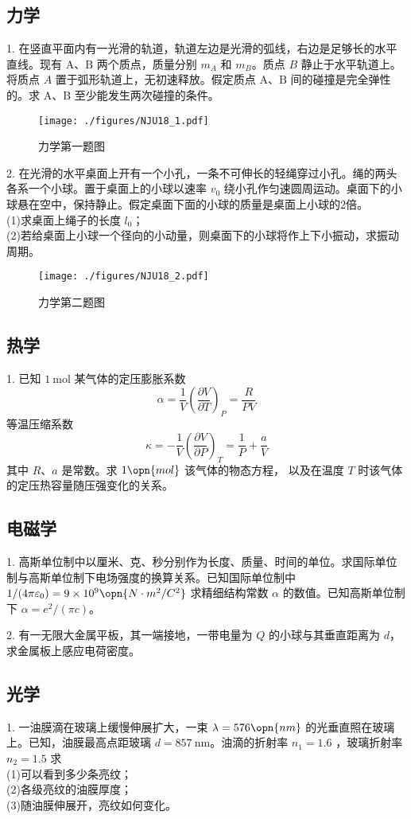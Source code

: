 \subsection{力学}
1. 在竖直平面内有一光滑的轨道，轨道左边是光滑的弧线，右边是足够长的水平直线。现有 $\mathrm{A}$、$\mathrm{B}$ 两个质点，质量分别 $m_{A}$ 和 $m_B$。质点 $B$ 静止于水平轨道上。将质点 $A$ 置于弧形轨道上，无初速释放。假定质点 $\mathrm{A}$、$\mathrm{B}$ 间的碰撞是完全弹性的。求 $\mathrm{A}$、$\mathrm{B}$ 至少能发生两次碰撞的条件。
\begin{figure}[ht]
\centering
\texttt{[image: ./figures/NJU18\_1.pdf]}
\caption{力学第一题图} \label{NJU18_fig1}
\end{figure}
2. 在光滑的水平桌面上开有一个小孔，一条不可伸长的轻绳穿过小孔。绳的两头各系一个小球。置于桌面上的小球以速率 $v_{0}$ 绕小孔作匀速圆周运动。桌面下的小球悬在空中，保持静止。假定桌面下面的小球的质量是桌面上小球的2倍。\\
(1)求桌面上绳子的长度 $l_{0}$；\\
(2)若给桌面上小球一个径向的小动量，则桌面下的小球将作上下小振动，求振动周期。
\begin{figure}[ht]
\centering
\texttt{[image: ./figures/NJU18\_2.pdf]}
\caption{力学第二题图} \label{NJU18_fig2}
\end{figure}
\subsection{热学}
1. 已知 $1 \mathrm{~mol}$ 某气体的定压膨胀系数
\begin{equation}
\alpha=\frac{1}{V}\left(\frac{\partial V}{\partial T}\right)_{P}=\frac{R}{P V}
\end{equation}
等温压缩系数 
\begin{equation}
\kappa=-\frac{1}{V}\left(\frac{\partial V}{\partial P}\right)_{T}=\frac{1}{P}+\frac{a}{V}
\end{equation}
其中 $R$、$a$ 是常数。求 $1\opn{mol}$ 该气体的物态方程， 以及在温度 $T$ 时该气体的定压热容量随压强变化的关系。
\subsection{电磁学}
1. 高斯单位制中以厘米、克、秒分别作为长度、质量、时间的单位。求国际单位制与高斯单位制下电场强度的换算关系。已知国际单位制中 $1/(4 \pi \varepsilon_{0})=9 \times 10^{9} \opn{N \cdot m^{2}/C^{2}}$ 求精细结构常数 $\alpha$ 的数值。已知高斯单位制下 $\alpha=e^{2}/(\pi c)$。

2. 有一无限大金属平板，其一端接地，一带电量为 $Q$ 的小球与其垂直距离为 $d$，求金属板上感应电荷密度。
\subsection{光学}
1. 一油膜滴在玻璃上缓慢伸展扩大，一束 $\lambda=576 \opn{nm}$ 的光垂直照在玻璃上。已知，油膜最高点距玻璃 $d=857 \mathrm{~nm}$。油滴的折射率 $n_{1}=1.6$ ，玻璃折射率 $n_{2}=1.5$ 求\\
(1)可以看到多少条亮纹；\\
(2)各级亮纹的油膜厚度；\\
(3)随油膜伸展开，亮纹如何变化。
